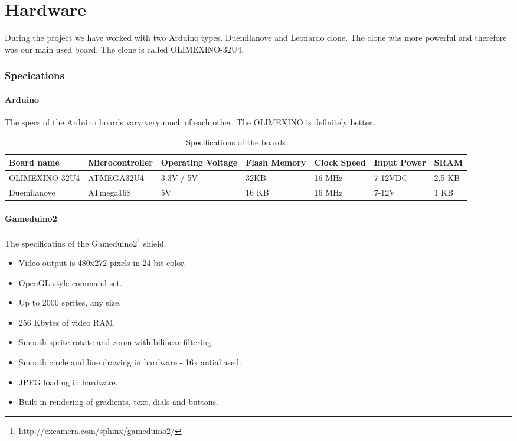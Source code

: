 \chapter{Hardware} %

During the project we have worked with two Arduino types. Duemilanove and Leonardo clone.
The clone was more powerful and therefore was our main used board. The clone is called
OLIMEXINO-32U4.
\subsection{Specications}

\subsubsection{Arduino}
The specs of the Arduino boards vary very much of each other. The OLIMEXINO is definitely
better.

\begin{table}[h]
\resizebox{16cm}{!} {
    \begin{tabular}{l|l|l|l|l|l|l}
    Board name     & Microcontroller & Operating Voltage & Flash Memory & Clock Speed & Input Power & SRAM   \\ \hline
    OLIMEXINO-32U4 & ATMEGA32U4      & 3.3V / 5V         & 32KB         & 16 MHz      & 7-12VDC     & 2.5 KB \\
    Duemilanove    & ATmega168       & 5V                & 16 KB        & 16 MHz      & 7-12V       & 1 KB   \\
    \end{tabular}
}
    \caption{Specifications of the boards}
\end{table}

\subsubsection{Gameduino2}
The specificatins of the Gameduino2\footnote{http://excamera.com/sphinx/gameduino2/} shield.

\begin{itemize}
  \footnotesize
  \item Video output is 480x272 pixels in 24-bit color.
  \item OpenGL-style command set.
  \item Up to 2000 sprites, any size.
  \item 256 Kbytes of video RAM.
  \item Smooth sprite rotate and zoom with bilinear filtering.
  \item Smooth circle and line drawing in hardware - 16x antialiased.
  \item JPEG loading in hardware.
  \item Built-in rendering of gradients, text, dials and buttons.
\end{itemize}


